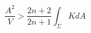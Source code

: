 \begin{equation}
\frac{A^{2}}{ V} > \frac{2n+2}{2n+1}\int_{\Sigma} K dA \label{reilly}
\end{equation}

